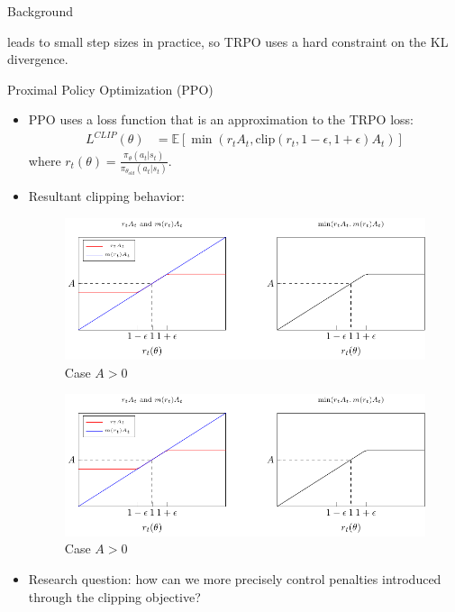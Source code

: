 \documentclass{beamer}
\begin{document}
\begin{frame}{Background}
\begin{itemize}
        leads to small step sizes in practice, so TRPO uses a hard constraint
        on the KL divergence.
    \end{itemize}
    \framebreak
    Proximal Policy Optimization (PPO)
    \begin{itemize}
        \item PPO uses a loss function that is an approximation to the TRPO
            loss:
        \begin{align*}
            L^{CLIP}(\theta) &= \mathbb{E}\left[ 
            \min\left(r_tA_t, \text{clip}
            (r_t, 1 - \epsilon, 1 + \epsilon)A_t\right)
            \right]
        \end{align*}
        where 
        $r_t(\theta) = 
        \frac
        {\pi_{\theta}(a_t | s_t)}
        {\pi_{\theta_{old}} (a_t | s_t)}$.
        \framebreak
        \item Resultant clipping behavior:\\
        \begin{center}
            \begin{figure}[H]
                \includegraphics[page=1, scale=0.6]{clip_graph/clip_graph}
                \caption{Case $A > 0$}
            \end{figure}
            \begin{figure}[H]
                \includegraphics[page=2, scale=0.6]{clip_graph/clip_graph}
                \caption{Case $A > 0$}
            \end{figure}
        \end{center}
        \framebreak
        \item Research question: how can we more precisely control penalties 
            introduced through the clipping objective?
    \end{itemize}
\end{frame}
\end{document}
